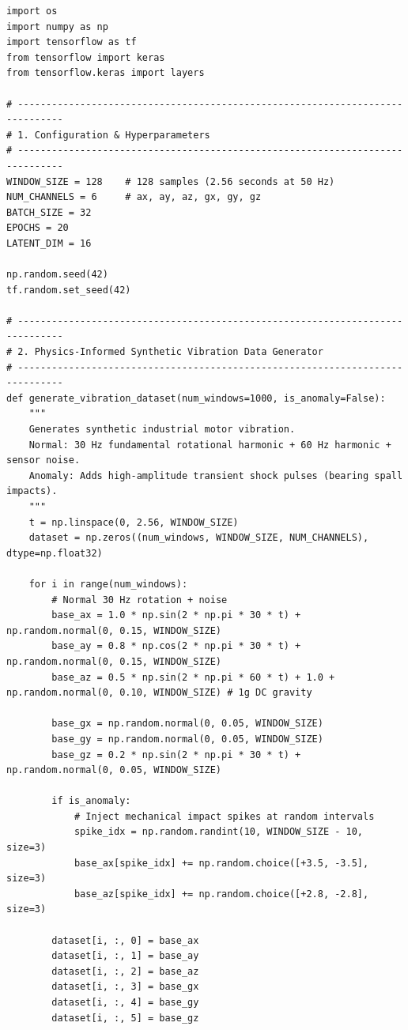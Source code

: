 \begin{lstlisting}[style=pythonstyle, caption={Complete Autoencoder Training, Threshold Calibration, and Int8 Quantization Pipeline.}, label={lst:autoencoder_pipeline}]
import os
import numpy as np
import tensorflow as tf
from tensorflow import keras
from tensorflow.keras import layers

# ------------------------------------------------------------------------------
# 1. Configuration & Hyperparameters
# ------------------------------------------------------------------------------
WINDOW_SIZE = 128    # 128 samples (2.56 seconds at 50 Hz)
NUM_CHANNELS = 6     # ax, ay, az, gx, gy, gz
BATCH_SIZE = 32
EPOCHS = 20
LATENT_DIM = 16

np.random.seed(42)
tf.random.set_seed(42)

# ------------------------------------------------------------------------------
# 2. Physics-Informed Synthetic Vibration Data Generator
# ------------------------------------------------------------------------------
def generate_vibration_dataset(num_windows=1000, is_anomaly=False):
    """
    Generates synthetic industrial motor vibration.
    Normal: 30 Hz fundamental rotational harmonic + 60 Hz harmonic + sensor noise.
    Anomaly: Adds high-amplitude transient shock pulses (bearing spall impacts).
    """
    t = np.linspace(0, 2.56, WINDOW_SIZE)
    dataset = np.zeros((num_windows, WINDOW_SIZE, NUM_CHANNELS), dtype=np.float32)

    for i in range(num_windows):
        # Normal 30 Hz rotation + noise
        base_ax = 1.0 * np.sin(2 * np.pi * 30 * t) + np.random.normal(0, 0.15, WINDOW_SIZE)
        base_ay = 0.8 * np.cos(2 * np.pi * 30 * t) + np.random.normal(0, 0.15, WINDOW_SIZE)
        base_az = 0.5 * np.sin(2 * np.pi * 60 * t) + 1.0 + np.random.normal(0, 0.10, WINDOW_SIZE) # 1g DC gravity
        
        base_gx = np.random.normal(0, 0.05, WINDOW_SIZE)
        base_gy = np.random.normal(0, 0.05, WINDOW_SIZE)
        base_gz = 0.2 * np.sin(2 * np.pi * 30 * t) + np.random.normal(0, 0.05, WINDOW_SIZE)

        if is_anomaly:
            # Inject mechanical impact spikes at random intervals
            spike_idx = np.random.randint(10, WINDOW_SIZE - 10, size=3)
            base_ax[spike_idx] += np.random.choice([+3.5, -3.5], size=3)
            base_az[spike_idx] += np.random.choice([+2.8, -2.8], size=3)

        dataset[i, :, 0] = base_ax
        dataset[i, :, 1] = base_ay
        dataset[i, :, 2] = base_az
        dataset[i, :, 3] = base_gx
        dataset[i, :, 4] = base_gy
        dataset[i, :, 5] = base_gz


\end{lstlisting}
